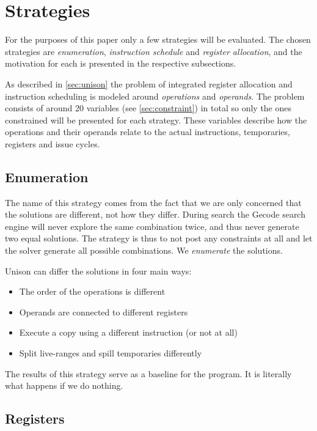 \section{Strategies}
\label{sec:strategies}

For the purposes of this paper only a few strategies will be evaluated. The chosen
strategies are \textit{enumeration}, \textit{instruction schedule} and
\textit{register allocation}, and the motivation for each is presented in the respective
subsections.

As described in \ref{sec:unison} the problem of integrated register allocation and
instruction scheduling is modeled around \textit{operations} and \textit{operands}. The
problem consists of around 20 variables (see \ref{sec:constraint}) in total so only the
ones constrained will be presented for each strategy. These variables describe how the
operations and their operands relate to the actual instructions, temporaries, registers
and issue cycles.

\subsection{Enumeration}

The name of this strategy comes from the fact that we are only concerned that the solutions
are different, not how they differ. During search the Gecode search engine will never
explore the same combination twice, and thus never generate two equal solutions. The
strategy is thus to not post any constraints at all and let the solver generate all
possible combinations. We \textit{enumerate} the solutions.

Unison can differ the solutions in four main ways:

\begin{itemize}
	\item The order of the operations is different
	\item Operands are connected to different registers
	\item Execute a copy using a different instruction (or not at all)
	\item Split live-ranges and spill temporaries differently
\end{itemize}

The results of this strategy serve as a baseline for the program. It is literally what
happens if we do nothing.

\subsection{Registers}

